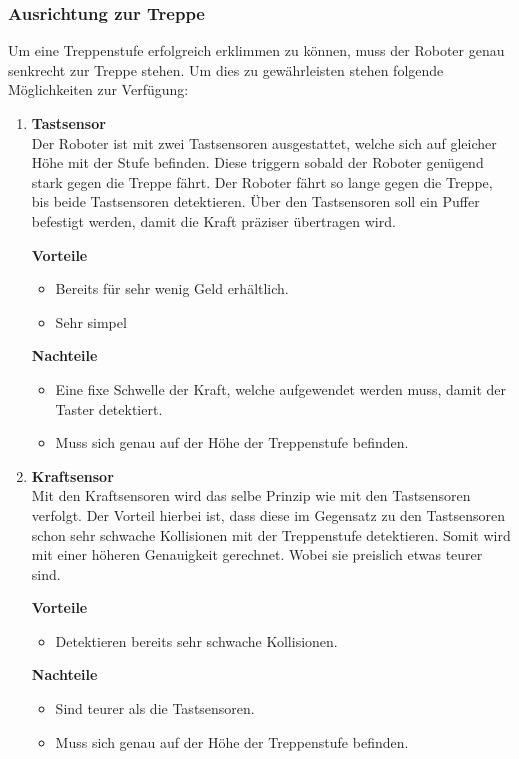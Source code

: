 \subsubsection{Ausrichtung zur Treppe}
\label{ausrichtung-zur-treppe}
Um eine Treppenstufe erfolgreich erklimmen zu können, muss der Roboter genau senkrecht zur Treppe stehen. Um dies zu gewährleisten stehen folgende Möglichkeiten zur Verfügung:
\begin{enumerate}
    \item \textbf{Tastsensor}\\
    Der Roboter ist mit zwei Tastsensoren ausgestattet, welche sich auf gleicher Höhe mit der Stufe befinden. Diese triggern sobald der Roboter genügend stark gegen die Treppe fährt. Der Roboter fährt so lange gegen die Treppe, bis beide Tastsensoren detektieren. Über den Tastsensoren soll ein Puffer befestigt werden, damit die Kraft präziser übertragen wird.
    
    \textbf{Vorteile}
    \begin{itemize}
        \item Bereits für sehr wenig Geld erhältlich.
        \item Sehr simpel
    \end{itemize}
    \textbf{Nachteile}
    \begin{itemize}
        \item Eine fixe Schwelle der Kraft, welche aufgewendet werden muss, damit der Taster detektiert.
        \item Muss sich genau auf der Höhe der Treppenstufe befinden.
    \end{itemize}
    
    \item \textbf{Kraftsensor}\\
    Mit den Kraftsensoren wird das selbe Prinzip wie mit den Tastsensoren verfolgt. Der Vorteil hierbei ist, dass diese im Gegensatz zu den Tastsensoren schon sehr schwache Kollisionen mit der Treppenstufe detektieren. Somit wird mit einer höheren Genauigkeit gerechnet. Wobei sie preislich etwas teurer sind.
    
    \textbf{Vorteile}
    \begin{itemize}
        \item Detektieren bereits sehr schwache Kollisionen.
    \end{itemize}
    \textbf{Nachteile}
    \begin{itemize}
        \item Sind teurer als die Tastsensoren.
        \item Muss sich genau auf der Höhe der Treppenstufe befinden.
    \end{itemize}
    

\end{enumerate}
